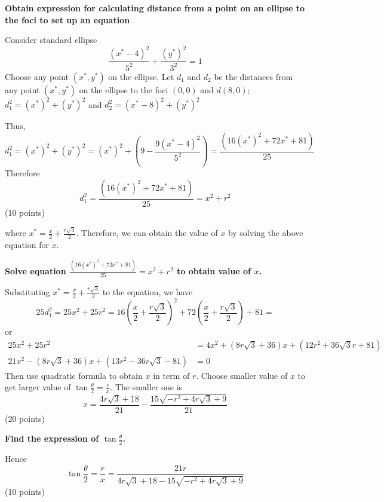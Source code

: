 \begin{description}
  \textbf{Obtain expression for calculating distance from a point on an
  ellipse to the foci to set up an equation}

  Consider standard ellipse
  \[
    \frac{(x^* - 4)^2}{5^2} + \frac{(y^*)^2}{3^2} = 1
  \]
  Choose any point $(x^*, y^*)$ on the ellipse. Let $d_1$ and $d_2$ be the
  distances from any point $(x^*, y^*)$ on the ellipse to the foci $(0{,}0)$
  and $d(8{,}0)$; $d_1^2 = (x^*)^2 + (y^*)^2$ and
  $d_2^2 = (x^* - 8)^2 + (y^*)^2$

  Thus,
  \[
    d_1^2 = (x^*)^2 + (y^*)^2
      = (x^*)^2 + \left(9 - \frac{9(x^* - 4)^2}{5^2}\right)
      = \frac{(16(x^*)^2 + 72x^* + 81)}{25}
  \]
  Therefore
  \[
    d_1^2 = \frac{(16(x^*)^2 + 72x^* + 81)}{25} = x^2 + r^2
  \]
  \hfill(10 points)

  where $x^* = \frac{x}{2} + \frac{r\sqrt{3}}{2}$. Therefore, we can obtain
  the value of $x$ by solving the above equation for $x$.

  \textbf{Solve equation
  $\frac{(16(x^*)^2 + 72x^* + 81)}{25} = x^2 + r^2$ to obtain value of $x$.}

  Substituting $x^* = \frac{x}{2} + \frac{r\sqrt{3}}{2}$ to the equation, we
  have
  \[
    25d_1^2 = 25x^2 + 25r^2
      = 16\left(\frac{x}{2} + \frac{r\sqrt{3}}{2}\right)^2
      + 72\left(\frac{x}{2} + \frac{r\sqrt{3}}{2}\right) + 81 = %
  \]
  or
  \begin{align*}
    25x^2 + 25r^2 &= 4x^2 + \left(8r\sqrt{3} + 36\right)x
      + \left(12r^2 + 36\sqrt{3}r + 81\right) \\
    21x^2 - \left(8r\sqrt{3} + 36\right)x
      + \left(13r^2 - 36r\sqrt{3} - 81\right) &= 0
  \end{align*}
  Then use quadratic formula to obtain $x$ in term of $r$. Choose smaller
  value of $x$ to get larger value of
  $\tan\frac{\theta}{2} = \frac{r}{x}$. The smaller one is
  \[
    x = \frac{4r\sqrt{3} + 18}{21}
      - \frac{15\sqrt{-r^2 + 4r\sqrt{3} + 9}}{21}
  \]
  \hfill(20 points)

  \textbf{Find the expression of $\tan\frac{\theta}{2}$.}

  Hence
  \[
    \tan\frac{\theta}{2} = \frac{r}{x}
      = \frac{21r}{4r\sqrt{3} + 18 - 15\sqrt{-r^2 + 4r\sqrt{3} + 9}}
  \]
  \hfill(10 points)
\end{description}
